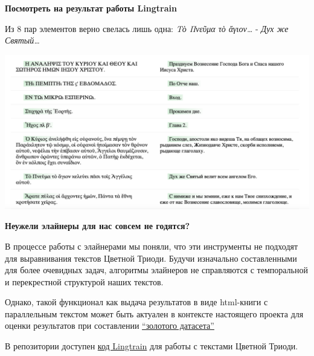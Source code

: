 \documentclass[
  letterpaper,
]{book}
\begin{document}
\begin{tcolorbox}[enhanced jigsaw, rightrule=.15mm, breakable, colframe=quarto-callout-caution-color-frame, colback=white, leftrule=.75mm, left=2mm, arc=.35mm, opacityback=0, toprule=.15mm, bottomrule=.15mm]

\textbf{Посмотреть на результат работы Lingtrain}\vspace{2mm}

Из 8 пар элементов верно свелась лишь одна: \emph{Τὸ Πνεῦμα τὸ
ἄγιον\ldots{}} - \emph{Дух же Святый\ldots{}}

\includegraphics{images/lingtrain_faulty_result.png}

\end{tcolorbox}

\begin{tcolorbox}[enhanced jigsaw, rightrule=.15mm, breakable, colframe=quarto-callout-note-color-frame, colback=white, leftrule=.75mm, left=2mm, arc=.35mm, opacityback=0, toprule=.15mm, bottomrule=.15mm]

\textbf{Неужели элайнеры для нас совсем не годятся?}\vspace{2mm}

В процессе работы с элайнерами мы поняли, что эти инструменты не
подходят для выравнивания текстов Цветной Триоди. Будучи изначально
составленными для более очевидных задач, алгоритмы элайнеров не
справляются с темпоральной и перекрестной структурой наших текстов.

Однако, такой функционал как выдача результатов в виде html-книги с
параллельным текстом может быть актуален в контексте настоящего проекта
для оценки результатов при составлении
\protect\hyperlink{sec-about_evluation}{``золотого датасета''}

\end{tcolorbox}

В репозитории доступен
\href{https://github.com/Drozhzhinastya/GSPC/blob/main/scripts/aligners/Lingtrain_LABse.ipynb}{код
Lingtrain} для работы с текстами Цветной Триоди.
\end{document}
